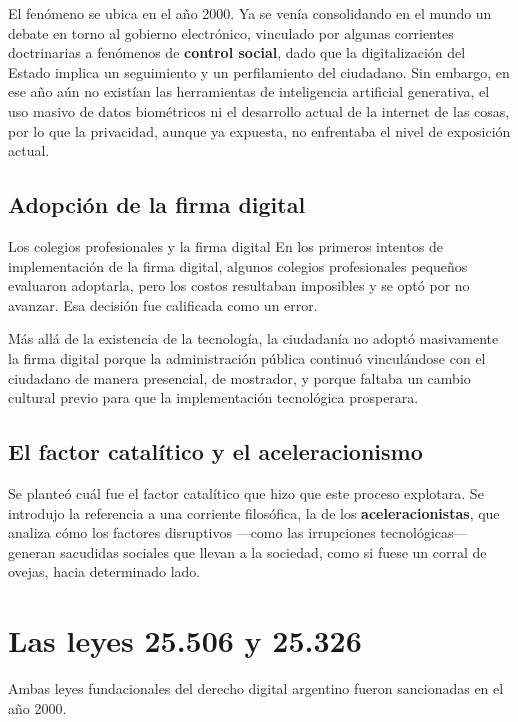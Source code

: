 \documentclass[12pt,oneside]{book}
\begin{document}
El fenómeno se ubica en el año 2000. Ya se venía consolidando en el mundo un debate en torno al gobierno electrónico, vinculado por algunas corrientes doctrinarias a fenómenos de \textbf{control social}, dado que la digitalización del Estado implica un seguimiento y un perfilamiento del ciudadano. Sin embargo, en ese año aún no existían las herramientas de inteligencia artificial generativa, el uso masivo de datos biométricos ni el desarrollo actual de la internet de las cosas, por lo que la privacidad, aunque ya expuesta, no enfrentaba el nivel de exposición actual.

\subsection{Adopción de la firma digital}

\begin{example}{Los colegios profesionales y la firma digital}
En los primeros intentos de implementación de la firma digital, algunos colegios profesionales pequeños evaluaron adoptarla, pero los costos resultaban imposibles y se optó por no avanzar. Esa decisión fue calificada como un error.

Más allá de la existencia de la tecnología, la ciudadanía no adoptó masivamente la firma digital porque la administración pública continuó vinculándose con el ciudadano de manera presencial, de mostrador, y porque faltaba un cambio cultural previo para que la implementación tecnológica prosperara.
\end{example}

\subsection{El factor catalítico y el aceleracionismo}

Se planteó cuál fue el factor catalítico que hizo que este proceso explotara. Se introdujo la referencia a una corriente filosófica, la de los \textbf{aceleracionistas}, que analiza cómo los factores disruptivos ---como las irrupciones tecnológicas--- generan sacudidas sociales que llevan a la sociedad, como si fuese un corral de ovejas, hacia determinado lado.

\section{Las leyes 25.506 y 25.326}

Ambas leyes fundacionales del derecho digital argentino fueron sancionadas en el año 2000.
\end{document}
